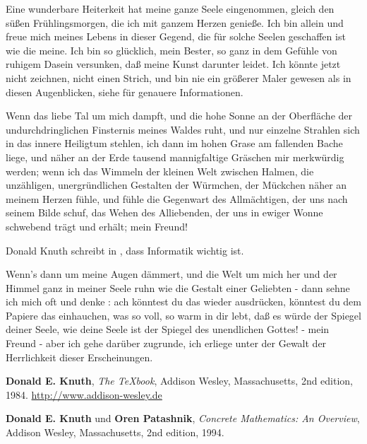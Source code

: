\documentclass[12pt,ngerman,parskip=half]{scrartcl}
\begin{document}
Eine wunderbare Heiterkeit hat meine ganze Seele eingenommen, gleich den süßen Frühlingsmorgen, die ich mit ganzem Herzen genieße. Ich bin allein und freue mich meines Lebens in dieser Gegend, die für solche Seelen geschaffen ist wie die meine. Ich bin so glücklich, mein Bester, so ganz in dem Gefühle von ruhigem Dasein versunken, daß meine Kunst darunter leidet. Ich könnte jetzt nicht zeichnen, nicht einen Strich, und bin nie ein größerer Maler gewesen als in diesen Augenblicken, siehe \cite{cc} für genauere Informationen.

Wenn das liebe Tal um mich dampft, und die hohe Sonne an der Oberfläche der undurchdringlichen Finsternis meines Waldes ruht, und nur einzelne Strahlen sich in das innere Heiligtum stehlen, ich dann im hohen Grase am fallenden Bache liege, und näher an der Erde tausend mannigfaltige Gräschen mir merkwürdig werden; wenn ich das Wimmeln der kleinen Welt zwischen Halmen, die unzähligen, unergründlichen Gestalten der Würmchen, der Mückchen näher an meinem Herzen fühle, und fühle die Gegenwart des Allmächtigen, der uns nach seinem Bilde schuf, das Wehen des Alliebenden, der uns in ewiger Wonne schwebend trägt und erhält; mein Freund! 

Donald Knuth schreibt in \cite{tb}, dass Informatik wichtig ist.

Wenn's dann um meine Augen dämmert, und die Welt um mich her und der Himmel ganz in meiner Seele ruhn wie die Gestalt einer Geliebten - dann sehne ich mich oft und denke : ach könntest du das wieder ausdrücken, könntest du dem Papiere das einhauchen, was so voll, so warm in dir lebt, daß es würde der Spiegel deiner Seele, wie deine Seele ist der Spiegel des unendlichen Gottes! - mein Freund - aber ich gehe darüber zugrunde, ich erliege unter der Gewalt der Herrlichkeit dieser Erscheinungen. 

\begin{thebibliography}{aa}

  \textbf{Donald E. Knuth},
  \textit{The \TeX book},
  Addison Wesley, Massachusetts,
  2nd edition, 1984. \url{http://www.addison-wesley.de}
  
  \textbf{Donald E. Knuth} und \textbf{Oren Patashnik}, 
  \textit{Concrete Mathematics: An Overview},
  Addison Wesley, Massachusetts,
  2nd edition, 1994.  

\end{thebibliography}
\end{document}
